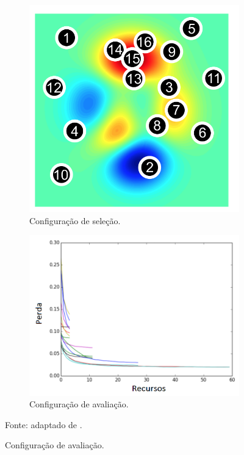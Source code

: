             \begin{figure}[H]
                \centering
                \caption{Algoritmo HyperBand.}
                \label{fig:hyperband}
                \begin{subfigure}{.5\textwidth}
                    \centering
                    \includegraphics[width=.7\linewidth]{imagens/configuration_selection.png}
                    \caption{Configuração de seleção.}
                    \label{fig:hyperband_configuration}
                \end{subfigure}%
                \begin{subfigure}{.5\textwidth}
                    \centering
                    \includegraphics[width=.95\linewidth]{imagens/configuration_evaluation.png}
                    \caption{Configuração de avaliação.}
                    \label{fig:hyperband_evaluation}
                \end{subfigure}
                \par \footnotesize Fonte: adaptado de \cite{li2018hyperband}.
            \end{figure}

